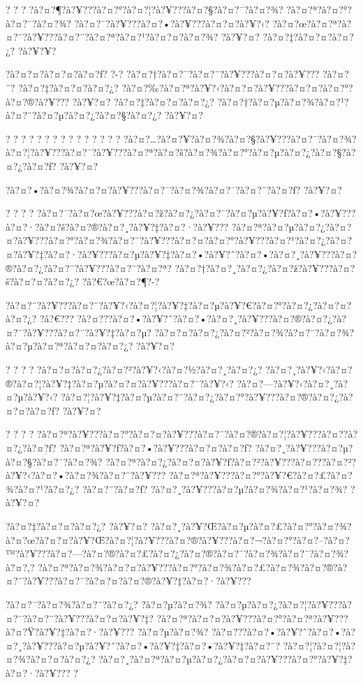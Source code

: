 \documentclass[11pt, openany]{book}
\begin{document}
{{{{{{{{{{{? ? ? ?à?¤?¶?à?¥???à?¤?°?à?¤?¦?à?¥???à?¤?§?à?¤?¯?à?¤?¾?
?à?¤?ª?à?¤?°?à?¤?¯?à?¤?¾? ?à?¤?¯?à?¥???à?¤?•?à?¥???à?¤?¤?à?¥?‹?
?à?¤?œ?à?¤?ª?à?¤?¨?à?¥???à?¤?¨?à?¤?ª?à?¤?¹?à?¤?¤?à?¤?¾? ?à?¥?¤?
?à?¤?‡?à?¤?¤?à?¤?¿? ?à?¥?¥?

?à?¤?¤?à?¤?¤?à?¤?ƒ? ?-? ?à?¤?†?à?¤?¯?à?¤?¨?à?¥???à?¤?¤?à?¥??? ?à?¤?¨?
?à?¤?‡?à?¤?¤?à?¤?¿?
?à?¤?‰?à?¤?ª?à?¥?‹?à?¤?¤?à?¥???à?¤?¤?à?¤?°?à?¤?®?à?¥??? ?à?¥?¤?
?à?¤?‡?à?¤?¤?à?¤?¿?
?à?¤?†?à?¤?µ?à?¤?¾?à?¤?¹?à?¤?¨?à?¤?µ?à?¤?¿?à?¤?§?à?¤?¿? ?à?¥?¤?

? ? ? ? ? ? ? ? ? ? ? ? ? ? ?
?à?¤?\ldots{}?à?¤?¥?à?¤?¾?à?¤?§?à?¥???à?¤?¯?à?¤?¾?à?¤?¦?à?¥???à?¤?¯?à?¥???à?¤?ª?à?¤?š?à?¤?¾?à?¤?°?à?¤?µ?à?¤?¿?à?¤?§?à?¤?¿?à?¤?ƒ?
?à?¥?¤?

?à?¤?•?à?¤?¾?à?¤?¤?à?¥???à?¤?¯?à?¤?¾?à?¤?¯?à?¤?¨?à?¤?ƒ? ?à?¥?¤?

? ? ? ?
?à?¤?¯?à?¤?œ?à?¥???à?¤?ž?à?¤?¿?à?¤?¯?à?¤?µ?à?¥?ƒ?à?¤?•?à?¥???à?¤?·?à?¤?š?à?¤?®?à?¤?¸?à?¥?‡?à?¤?·?à?¥???
?à?¤?ª?à?¤?µ?à?¤?¿?à?¤?¤?à?¥???à?¤?°?à?¤?¾?à?¤?¨?à?¥???à?¤?¤?à?¤?°?à?¥???à?¤?¹?à?¤?¿?à?¤?¤?à?¥?‡?à?¤?·?à?¥???à?¤?µ?à?¥?‡?à?¤?•?à?¥?ˆ?à?¤?•?à?¤?¸?à?¥???à?¤?®?à?¤?¿?à?¤?¨?à?¥???à?¤?¨?à?¤?ª?
?à?¤?†?à?¤?¸?à?¤?¿?à?¤?ž?à?¥???à?¤?š?à?¤?¤?à?¤?¿? ?â?€?œ?à?¤?¶?-?

?à?¤?¨?à?¥???à?¤?¨?à?¥?‹?à?¤?¦?à?¥?‡?à?¤?µ?à?¥?€?à?¤?°?à?¤?¿?à?¤?¤?à?¤?¿?
?â?€???
?à?¤???à?¤?•?à?¥?ˆ?à?¤?•?à?¤?¸?à?¥???à?¤?®?à?¤?¿?à?¤?¨?à?¥???à?¤?¨?à?¥?‡?à?¤?µ?
?à?¤?¤?à?¤?¿?à?¤?²?à?¤?¾?à?¤?¨?à?¤?¾?à?¤?µ?à?¤?ª?à?¤?¤?à?¤?¿? ?à?¥?¤?

? ? ? ? ?à?¤?¤?à?¤?¿?à?¤?²?à?¥?‹?à?¤?½?à?¤?¸?à?¤?¿?
?à?¤?¸?à?¥?‹?à?¤?®?à?¤?¦?à?¥?‡?à?¤?µ?à?¤?¤?à?¥???à?¤?¯?à?¥?‹?
?à?¤?---?à?¥?‹?à?¤?¸?à?¤?µ?à?¥?‹?
?à?¤?¦?à?¥?‡?à?¤?µ?à?¤?¨?à?¤?¿?à?¤?°?à?¥???à?¤?®?à?¤?¿?à?¤?¤?à?¤?ƒ?
?à?¥?¤?

? ? ? ?
?à?¤?ª?à?¥???à?¤?°?à?¤?¤?à?¥???à?¤?¨?à?¤?®?à?¤?¦?à?¥???à?¤?­?à?¤?¿?à?¤?ƒ?
?à?¤?ª?à?¥?ƒ?à?¤?•?à?¥???à?¤?¤?à?¤?ƒ?
?à?¤?¸?à?¥???à?¤?µ?à?¤?§?à?¤?¯?à?¤?¾?
?à?¤?ª?à?¤?¿?à?¤?¤?à?¥?ƒ?à?¤?²?à?¥???à?¤???à?¤?²?à?¥?‹?à?¤?•?à?¤?¾?à?¤?¨?à?¥???
?à?¤?ª?à?¥???à?¤?°?à?¥?€?à?¤?£?à?¤?¾?à?¤?¹?à?¤?¿? ?à?¤?¨?à?¤?ƒ?
?à?¤?¸?à?¥???à?¤?µ?à?¤?¾?à?¤?¹?à?¤?¾? ?à?¥?¤?

?à?¤?‡?à?¤?¤?à?¤?¿? ?à?¥?¤?
?à?¤?¸?à?¥?Œ?à?¤?µ?à?¤?£?à?¤?°?à?¤?¾?à?¤?œ?à?¤?¤?à?¥?Œ?à?¤?¦?à?¥???à?¤?®?à?¥???à?¤?¬?à?¤?°?à?¤?--?à?¤?™?à?¥???à?¤?---?à?¤?®?à?¤?£?à?¤?¿?à?¤?®?à?¤?¯?à?¤?¾?à?¤?¨?à?¤?¾?à?¤?‚?
?à?¤?ª?à?¤?¾?à?¤?¤?à?¥???à?¤?°?à?¤?¾?à?¤?£?à?¤?¾?à?¤?®?à?¤?¨?à?¥???à?¤?¯?à?¤?¤?à?¤?®?à?¥?‡?à?¤?·?à?¥???

?à?¤?¯?à?¤?¾?à?¤?¨?à?¤?¿? ?à?¤?µ?à?¤?¾?
?à?¤?µ?à?¤?¿?à?¤?¦?à?¥???à?¤?¯?à?¤?¨?à?¥???à?¤?¤?à?¥?‡?
?à?¤?ª?à?¤?¤?à?¥???à?¤?°?à?¤?ª?à?¥???à?¤?Ÿ?à?¥?‡?à?¤?·?à?¥???
?à?¤?µ?à?¤?¾?
?à?¤???à?¤?•?à?¥?ˆ?à?¤?•?à?¤?¸?à?¥???à?¤?µ?à?¥?ˆ?à?¤?•?à?¥?‡?à?¤?•?à?¥?‡?à?¤?¨?
?à?¤?¦?à?¤?¦?à?¤?¾?à?¤?¤?à?¤?¿?
?à?¤?¸?à?¤?ª?à?¤?µ?à?¤?¿?à?¤?¤?à?¥???à?¤?°?à?¥?‡?à?¤?·?à?¥??? ?

}}}}}}}}}}}
\end{document}
